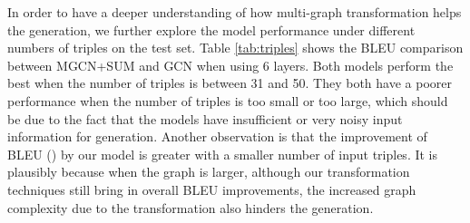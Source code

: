 \documentclass[11pt,a4paper]{article}
\begin{document}
\begin{table}[t!]
	\centering
\caption{Results of the ablation study.}
	\label{tab:ablation}
\end{table}


In order to have a deeper understanding of how multi-graph transformation helps the generation, we further explore the model performance under different numbers of triples on the test set.
Table \ref{tab:triples} shows the BLEU comparison between MGCN+SUM and GCN when using 6 layers.
Both models perform the best when the number of triples is between 31 and 50.
They both have a poorer performance when the number of triples is too small or too large, which should be due to the fact that the models have insufficient or very noisy input information for generation. 
Another observation is that the improvement of BLEU () by our model is greater with a smaller number of input triples. It is plausibly because when the graph is larger, although our transformation techniques still bring in overall BLEU improvements, the increased graph complexity due to the transformation also hinders the generation.
\end{document}
